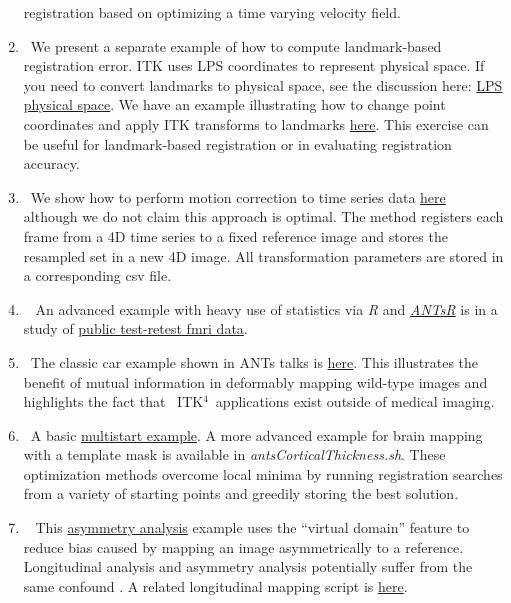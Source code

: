 \documentclass{frontiersSCNS}
\newcommand{\tk}{~ITK$^{\text{4}}$~}
\begin{document}
\begin{enumerate}
     registration based on optimizing a time
     varying velocity field.
  \item~We present a separate example of how to compute landmark-based
    registration error.  ITK uses LPS coordinates to represent physical space.  If you
    need to convert landmarks to physical space, see the discussion here:
    \href{http://sourceforge.net/p/advants/discussion/840261/thread/2a1e9307/}{LPS
      physical
      space}.  We have an example illustrating how to change point
    coordinates and apply ITK transforms to landmarks
    \href{http://stnava.github.io/chicken/}{here}.  This exercise can
    be useful for landmark-based registration or in evaluating
    registration accuracy.
  \item~We show how to perform motion correction to time series data
    \href{https://github.com/stnava/ANTs/blob/master/Scripts/antsMotionCorrExample}{here}
    although we do not claim this approach is optimal.  The method
    registers each frame from a 4D time series to a fixed reference
    image and stores the resampled set in a new 4D image.  All
    transformation parameters are stored in a corresponding csv file.
   \item~ An advanced example with heavy use of statistics via \textit{R} and \href{http://stnava.github.io/ANTsR/}{\textit{ANTsR}} is in
     a study of \href{http://stnava.github.io/RfMRI/}{public test-retest fmri data}. %
  \item~The classic car example shown in ANTs talks is
    \href{http://stnava.github.io/cars/}{here}.  This illustrates the
    benefit of mutual information in deformably mapping wild-type
    images and highlights the fact that \tk applications exist outside
    of medical imaging.
  \item~A basic \href{http://stnava.github.io/butterfly/}{multistart example}.  A more advanced
    example for brain mapping with a template mask is available in
    \textit{antsCorticalThickness.sh}.  These optimization methods
    overcome local minima by running registration searches from a
    variety of starting points and greedily storing the best solution.
   \item~  This \href{http://stnava.github.io/asymmetry/}{asymmetry
       analysis} example uses the ``virtual domain'' feature to reduce
     bias caused by mapping an image asymmetrically to a reference.
     Longitudinal analysis and asymmetry analysis potentially suffer
     from the same confound \cite{Yushkevich2010a}.  A related
     longitudinal mapping script is \href{https://github.com/stnava/ANTs/blob/master/Scripts/unbiased_longitudinal_map}{here}.

\end{enumerate}
\end{document}
